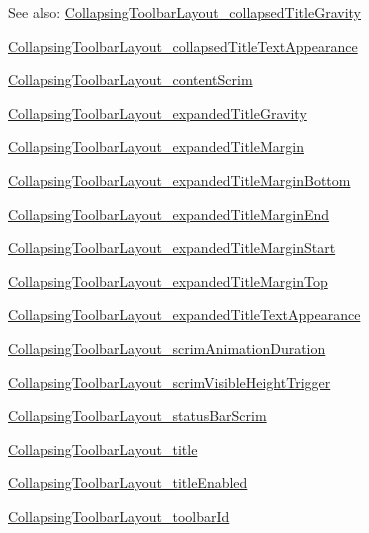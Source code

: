 \begin{Desc}
\item[See also:]\hyperlink{classandroid_1_1support_1_1v4_1_1_r_1_1styleable_759294fa22d1c3489a65fb1670048ebd}{CollapsingToolbarLayout\_\-collapsedTitleGravity} 

\hyperlink{classandroid_1_1support_1_1v4_1_1_r_1_1styleable_36b5814dff9ad7add6371c9f816f66f0}{CollapsingToolbarLayout\_\-collapsedTitleTextAppearance} 

\hyperlink{classandroid_1_1support_1_1v4_1_1_r_1_1styleable_060f29f1813e3c34f37be84c9cad4fcd}{CollapsingToolbarLayout\_\-contentScrim} 

\hyperlink{classandroid_1_1support_1_1v4_1_1_r_1_1styleable_93665cc12bb385c8014cbdcaa5d898a6}{CollapsingToolbarLayout\_\-expandedTitleGravity} 

\hyperlink{classandroid_1_1support_1_1v4_1_1_r_1_1styleable_d2288d088bf1c64e433d0cbecf59b50e}{CollapsingToolbarLayout\_\-expandedTitleMargin} 

\hyperlink{classandroid_1_1support_1_1v4_1_1_r_1_1styleable_3c19128c4f13cc0876d4f6a58f4e2d88}{CollapsingToolbarLayout\_\-expandedTitleMarginBottom} 

\hyperlink{classandroid_1_1support_1_1v4_1_1_r_1_1styleable_51a799757acf71b646e197b66d32c630}{CollapsingToolbarLayout\_\-expandedTitleMarginEnd} 

\hyperlink{classandroid_1_1support_1_1v4_1_1_r_1_1styleable_84d535c1e152dbfcb33c3dda89373800}{CollapsingToolbarLayout\_\-expandedTitleMarginStart} 

\hyperlink{classandroid_1_1support_1_1v4_1_1_r_1_1styleable_ed514040b0b3e40f9813597f18ec5fa8}{CollapsingToolbarLayout\_\-expandedTitleMarginTop} 

\hyperlink{classandroid_1_1support_1_1v4_1_1_r_1_1styleable_28094fe9aadbf7fa99afd24d0f68a70e}{CollapsingToolbarLayout\_\-expandedTitleTextAppearance} 

\hyperlink{classandroid_1_1support_1_1v4_1_1_r_1_1styleable_86f1d13a3a764019f8ea6f2166dabaac}{CollapsingToolbarLayout\_\-scrimAnimationDuration} 

\hyperlink{classandroid_1_1support_1_1v4_1_1_r_1_1styleable_ef297f6084b2419ca1056fa3c53bc36f}{CollapsingToolbarLayout\_\-scrimVisibleHeightTrigger} 

\hyperlink{classandroid_1_1support_1_1v4_1_1_r_1_1styleable_6a591832849ef0da0ef6a52fc4f0b623}{CollapsingToolbarLayout\_\-statusBarScrim} 

\hyperlink{classandroid_1_1support_1_1v4_1_1_r_1_1styleable_496e34c231a07ed97f239394f3eda86e}{CollapsingToolbarLayout\_\-title} 

\hyperlink{classandroid_1_1support_1_1v4_1_1_r_1_1styleable_37213d22bd11ccc3f3d3c343c9828a91}{CollapsingToolbarLayout\_\-titleEnabled} 

\hyperlink{classandroid_1_1support_1_1v4_1_1_r_1_1styleable_9f99f544b90e15c7d36234462470e3f7}{CollapsingToolbarLayout\_\-toolbarId} \end{Desc}
